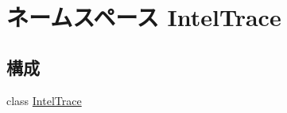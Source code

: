 \hypertarget{namespaceIntelTrace}{
\section{ネームスペース IntelTrace}
\label{namespaceIntelTrace}
}
\subsection*{構成}
\begin{DoxyCompactItemize}
\item 
class \hyperlink{classIntelTrace_1_1IntelTrace}{IntelTrace}
\end{DoxyCompactItemize}
